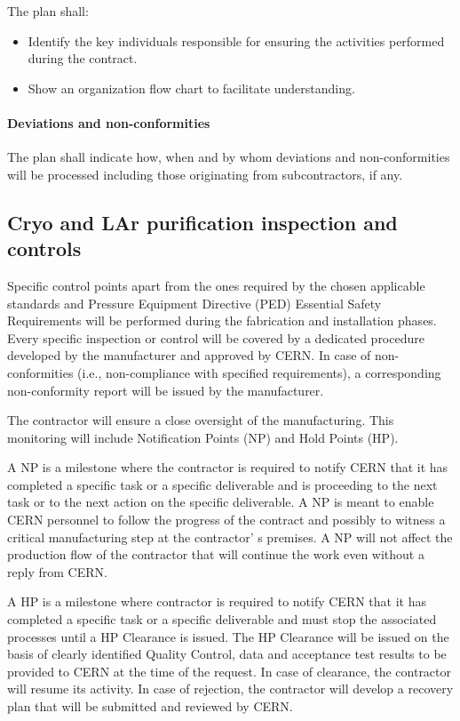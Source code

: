 The plan shall:
\begin{itemize}
\item Identify the key individuals responsible for ensuring the activities performed during the contract.
\item Show an organization flow chart to facilitate understanding.
\end{itemize}

\paragraph{Deviations and non-conformities}

The plan shall indicate how, when and by whom deviations and non-conformities will be processed including those originating from subcontractors, if any.

\subsection{Cryo and LAr purification inspection and controls}

Specific control points apart from the ones required by the chosen applicable standards and Pressure Equipment Directive (PED) Essential Safety Requirements
 will be performed during the fabrication and installation phases. Every specific inspection or control will be covered by a dedicated procedure developed by the manufacturer and approved by CERN. In case of non-conformities (i.e., non-compliance with specified requirements), a corresponding non-conformity report will be issued by the manufacturer.

The contractor will ensure a close oversight of the manufacturing. This monitoring will include Notification Points (NP) and Hold Points (HP).

A NP is a milestone where the contractor is required to notify CERN that it has completed a specific task or a specific deliverable and is proceeding to the next task or to the next action on the specific deliverable. A NP is meant to enable CERN personnel to follow the progress of the contract and possibly to witness a critical manufacturing step at the contractor' s premises. A NP will not affect the production flow of the contractor that will continue the work even without a reply from CERN. 

A HP is a milestone where contractor is required to notify CERN that it has completed a specific task or a specific deliverable and must stop the associated processes until a HP Clearance is issued. The HP Clearance will be issued on the basis of clearly identified Quality Control, data and acceptance test results to be provided to CERN at the time of the request. In case of clearance, the contractor will resume its activity. In case of rejection, the contractor will develop a recovery plan that will be submitted and reviewed by CERN.

